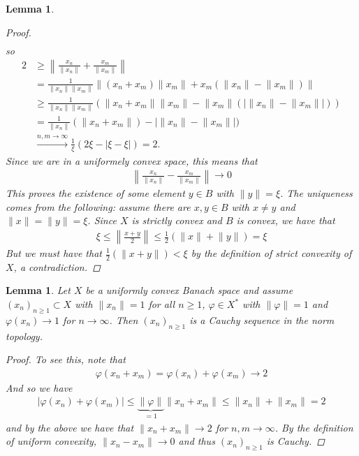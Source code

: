 \documentclass[10pt,twoside,openany,final]{memoir}
\theoremstyle{break}
\newtheorem{lemma}[section]{Lemma}
\theoremstyle{Break}
\newcommand{\lv}{\lVert}
\newcommand{\rv}{\rVert}
\begin{document}
\begin{lemma}
\begin{proof}
\begin{align*}
\end{align*}
so
\begin{align*}
2 &\geq \left\lv \frac{x_{n}}{\lv x_{n}\rv}+\frac{x_{m}}{\lv x_{m}\rv} \right\lv\\
&= \frac{1}{\lv x_{n} \rv \lv x_{m} \rv} \left\lv (x_{n}+x_{m}) \lv x_{m} \rv + x_{m}(\lv x_{n} \rv - \lv x_{m} \rv ) \right\lv \\
& \geq \frac{1}{\lv x_{n}\rv \lv x_{m}\rv} \left( \lv x_{n}+x_{m} \rv \lv x_{m} \rv -  \lv x_{m} \rv (\big| \lv x_{n} \rv - \lv x_{m}\rv\big|)\right) \\
&= \frac{1}{\lv x_{n}\rv} ( \lv x_{n}+x_{m} \rv) - \big|\lv x_{n} \rv - \lv x_{m} \rv\big|)\\
&\stackrel{n,m\to \infty}{\to} \frac{1}{\xi}(2\xi-|\xi-\xi|)=2.
\end{align*}
Since we are in a uniformely convex space, this means that
\begin{align*}
\left\lv \frac{x_{n}}{\lv x_{n} \rv} - \frac{x_{m}}{\lv x_{m}\rv} \right\rv \to 0
\end{align*}
This proves the existence of some element $y \in B$ with $\lv y \rv =\xi$. The uniqueness comes from the following: assume there are $x,y \in B$ with $x \neq y$ and $\lv x\rv = \lv y \rv = \xi$. Since $X$ is strictly convex and $B$ is convex, we have that 
\begin{align*}
 \xi \leq \left \lv \frac{x+y}{2} \right \rv\leq \frac12(\lv x \rv + \lv y \rv) = \xi
\end{align*}
But we must have that $\frac12 (\lv x  +  y \rv) < \xi$ by the definition of strict convexity of $X$, a contradiction.
\end{proof}
\end{lemma}

\begin{lemma}\label{rudin 2}
Let $X$ be a uniformly convex Banach space and assume $(x_{n})_{n\geq 1} \subset X$ with $\lv x_{n}\rv =1$ for all $n \geq 1$, $\varphi \in X^*$ with $\lv \varphi \rv =1$ and $\varphi(x_{n}) \to 1$ for $n \to \infty$. Then $(x_{n})_{n\geq 1}$ is a Cauchy sequence in the norm topology.
\begin{proof}
To see this, note that
\begin{align*}
\varphi(x_{n}+x_{m})=\varphi(x_{n})+\varphi(x_{m}) \to 2
\end{align*}
And so we have
\begin{align*}
| \varphi (x_{n})+\varphi(x_{m}) | \leq   \underbrace{\lv\varphi\rv}_{=1}  \lv x_{n}+x_{m}\rv \leq \lv x_{n} \rv + \lv x_{m} \rv =2
\end{align*}
and by the above we have that $\lv x_{n}+x_{m}\rv \to 2$ for $n,m \to \infty$. By the definition of uniform convexity, $\lv x_{n}-x_{m}\rv \to 0$ and thus $(x_n)_{n\geq 1}$ is Cauchy.
\end{proof}
\end{lemma}
\end{document}
